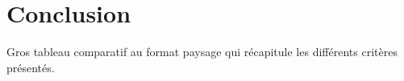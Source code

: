 \section{Conclusion}
\begin{todo}
Gros tableau comparatif au format paysage qui récapitule les différents critères présentés.
\end{todo}
